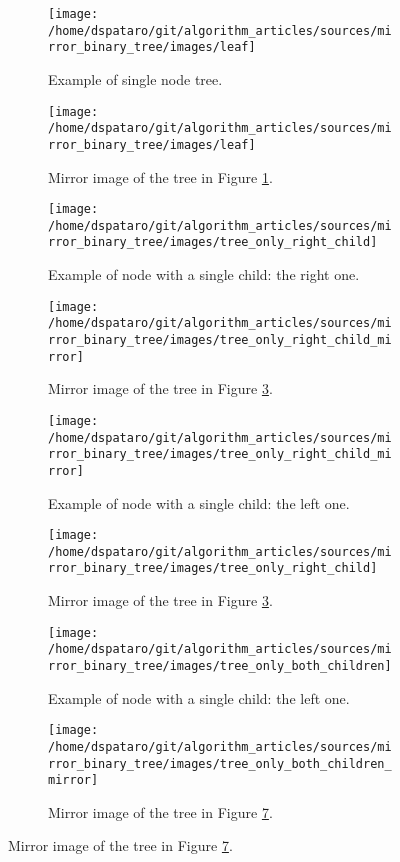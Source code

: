 \begin{figure}
	\centering
	\begin{subfigure}[b]{0.4\textwidth}
		\texttt{[image: /home/dspataro/git/algorithm\_articles/sources/mirror\_binary\_tree/images/leaf]}
		\caption{Example of single node tree.}
		\label{fig:mirro_binary_tree:leaf}
	 \end{subfigure}
	 \hfill
	 \begin{subfigure}[b]{0.4\textwidth}
		\texttt{[image: /home/dspataro/git/algorithm\_articles/sources/mirror\_binary\_tree/images/leaf]}
		\caption{Mirror image of the tree in Figure \ref{fig:mirro_binary_tree:leaf}.}
		\label{fig:mirro_binary_tree:leaf_mirror}
	 \end{subfigure}
	 
	 \centering

	\begin{subfigure}[b]{0.4\textwidth}
		\texttt{[image: /home/dspataro/git/algorithm\_articles/sources/mirror\_binary\_tree/images/tree\_only\_right\_child]}
		\caption{Example of node with a single child: the right one.}
		\label{fig:mirro_binary_tree:single_right}
	 \end{subfigure}
	 \hfill
	 \begin{subfigure}[b]{0.4\textwidth}
		\texttt{[image: /home/dspataro/git/algorithm\_articles/sources/mirror\_binary\_tree/images/tree\_only\_right\_child\_mirror]}
		\caption{Mirror image of the tree in Figure \ref{fig:mirro_binary_tree:single_right}.}
		\label{fig:mirro_binary_tree:single_right_mirror}
	 \end{subfigure}

	 \hfill
	 \begin{subfigure}[b]{0.4\textwidth}
		\texttt{[image: /home/dspataro/git/algorithm\_articles/sources/mirror\_binary\_tree/images/tree\_only\_right\_child\_mirror]}
		\caption{Example of node with a single child: the left one.}
		\label{fig:mirro_binary_tree:single_left}
	 \end{subfigure}
	 \hfill
	 \begin{subfigure}[b]{0.4\textwidth}
		\texttt{[image: /home/dspataro/git/algorithm\_articles/sources/mirror\_binary\_tree/images/tree\_only\_right\_child]}
		\caption{Mirror image of the tree in Figure \ref{fig:mirro_binary_tree:single_right}.}
		\label{fig:mirro_binary_tree:single_left_mirror}
	 \end{subfigure}
	
	 \hfill

	 \begin{subfigure}[b]{0.4\textwidth}
		\texttt{[image: /home/dspataro/git/algorithm\_articles/sources/mirror\_binary\_tree/images/tree\_only\_both\_children]}
		\caption{Example of node with a single child: the left one.}
		\label{fig:mirro_binary_tree:tree_only_both_children}
	 \end{subfigure}
	 \hfill
	 \begin{subfigure}[b]{0.4\textwidth}
		\texttt{[image: /home/dspataro/git/algorithm\_articles/sources/mirror\_binary\_tree/images/tree\_only\_both\_children\_mirror]}
		\caption{Mirror image of the tree in Figure
		\ref{fig:mirro_binary_tree:tree_only_both_children}.}
		\label{fig:mirro_binary_tree:tree_only_both_children_mirror}
	 \end{subfigure}



\end{figure}
